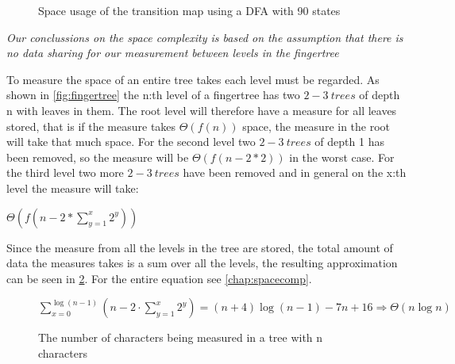 \begin{figure}[!h]
\caption{Space usage of the transition map using a DFA with 90 states\label{fig:IncSpace}}
\end{figure}

\emph{Our conclussions on the space complexity is based on the assumption that
there is no data sharing for our measurement between levels in the fingertree}

To measure the space of an entire tree takes each level must be regarded. As shown
in \cref{fig:fingertree} the n:th level of a fingertree has two $2-3~trees$ of
depth n with leaves in them. The root level will therefore have a measure for
all leaves stored, that is if the measure takes $\Theta(f(n))$ space, the
measure in the root will take that much space. For the second level two
$2-3~trees$ of depth 1 has been removed, so the measure will be $\Theta(f(n-2*2))$
in the worst case. For the third level two more $2-3~trees$ have been removed and
in general on the x:th level the measure will take:
\begin{center}$\Theta(f(n-2*\sum\limits_{y=1}^x2^y))$\end{center}
Since the measure from all the levels in
the tree are stored, the total amount of data the measures takes is a sum over
all the levels, the resulting approximation can be seen in \cref{fig:MeaChar}.
For the entire equation see \cref{chap:spacecomp}.

\begin{figure}[!h]
\begin{center}
$\sum\limits_{x=0}^{\log (n-1)}(n- 2 \cdot \sum\limits_{y=1}^x2^y) =
(n+4)\log(n-1) - 7n + 16 \Rightarrow \Theta(n\log n)$
\end{center}
\caption{The number of characters being measured in a tree with n characters\label{fig:MeaChar}}
\end{figure}

